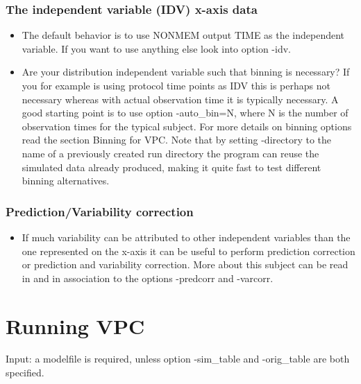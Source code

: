 \subsubsection*{The independent variable (IDV) x-axis data}

\begin{itemize}
\item The default behavior is to use NONMEM output TIME as the independent variable. If you want to use anything else look into option -idv.
\item Are your distribution independent variable such that binning is necessary? If you for example is using protocol time points as IDV this is perhaps not necessary whereas with actual observation time it is typically necessary. A good starting point is to use option -auto\_bin=N, where N is the number of observation times for the typical subject. For more details on binning options read the section Binning for VPC. Note that by setting -directory to the name of a previously created run directory the program can reuse the simulated data already produced, making it quite fast to test different binning alternatives.
\end{itemize}

\subsubsection*{Prediction/Variability correction}

\begin{itemize}
	\item If much variability can be attributed to other independent variables than the one represented on the x-axis it can be useful to perform prediction correction or prediction and variability correction. More about this subject can be read in \cite{Bergstrand} and in association to the options -predcorr and -varcorr.
\end{itemize}


\section{Running VPC}
Input: a modelfile is required, unless option -sim\_table and -orig\_table are both specified.

